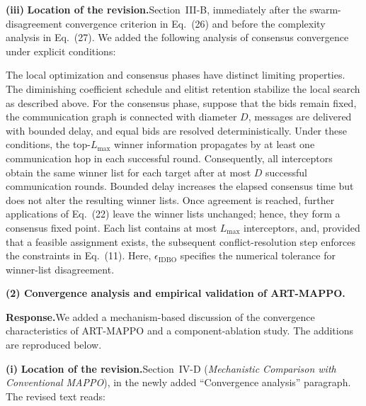 \documentclass[11pt]{article}
\newcommand{\hladd}[1]{{\color{addblue}#1}}
\newcommand{\rsp}{\medskip\noindent\textbf{Response.}\quad}
\newcommand{\loc}{\medskip\noindent\textbf{Location of the revision.}\quad}
\begin{document}
\medskip
\noindent\textbf{(iii)}
\loc Section~III-B, immediately after the swarm-disagreement convergence
criterion in Eq.~(26) and before the complexity analysis in Eq.~(27). 
We added the following analysis of consensus convergence under explicit conditions:

\begin{tcolorbox}[enhanced,breakable,colback=white,colframe=addblue!55,
boxrule=0.6pt,arc=2pt,left=9pt,right=9pt,top=7pt,bottom=7pt]

\medskip
\hladd{The local optimization and consensus phases have distinct limiting
properties. The diminishing coefficient schedule and elitist retention
stabilize the local search as described above. For the consensus phase,
suppose that the bids remain fixed, the communication graph is connected
with diameter $D$, messages are delivered with bounded delay, and equal bids
are resolved deterministically. Under these conditions, the top-$L_{\max}$
winner information propagates by at least one communication hop in each
successful round. Consequently, all interceptors obtain the same winner list
for each target after at most $D$ successful communication rounds. Bounded
delay increases the elapsed consensus time but does not alter the resulting
winner lists. Once agreement is reached, further applications of Eq.~(22)
leave the winner lists unchanged; hence, they form a consensus fixed point.
Each list contains at most $L_{\max}$ interceptors, and, provided that a
feasible assignment exists, the subsequent conflict-resolution step enforces
the constraints in Eq.~(11). Here, $\epsilon_{\mathrm{IDBO}}$ specifies the
numerical tolerance for winner-list disagreement.}
\end{tcolorbox}



\medskip
\noindent\textbf{(2) Convergence analysis and empirical validation of
ART-MAPPO.}

\rsp We added a mechanism-based discussion of the convergence characteristics
of ART-MAPPO and a component-ablation study. The additions are reproduced
below.

\medskip
\noindent\textbf{(i)}
\loc Section~IV-D (\emph{Mechanistic Comparison with Conventional MAPPO}),
in the newly added ``Convergence analysis'' paragraph. The revised text reads:
\end{document}
